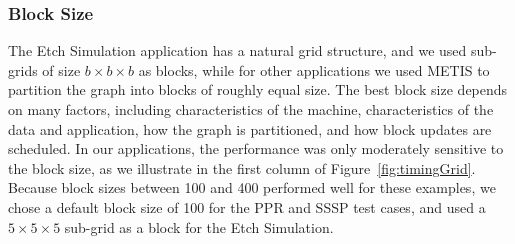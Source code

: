 \subsubsection{Block Size} 
The Etch Simulation application has a natural grid structure, and
we used sub-grids of size $b \times b \times b$ as blocks, while for
other applications we used METIS to partition the graph into blocks
of roughly equal size.
%
%
The best block size depends on many factors, including characteristics
of the machine, characteristics of the data and application, how the
graph is partitioned, and how block updates are scheduled.
%
%
In our applications, the performance was only moderately sensitive to
the block size, as we illustrate in the first column of
Figure~\ref{fig:timingGrid}.  Because block sizes between 100 and 400
performed well for these examples, we chose a default block size of
100 for the PPR and SSSP test cases, and used a $5 \times 5 \times 5$
sub-grid as a block for the Etch Simulation.


